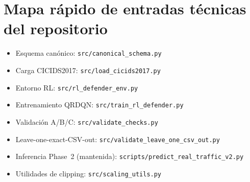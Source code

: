 \documentclass[12pt,a4paper]{article}
\begin{document}
\section{Mapa rápido de entradas técnicas del repositorio}

\begin{itemize}
  \item Esquema canónico: \verb|src/canonical_schema.py|
  \item Carga CICIDS2017: \verb|src/load_cicids2017.py|
  \item Entorno RL: \verb|src/rl_defender_env.py|
  \item Entrenamiento QRDQN: \verb|src/train_rl_defender.py|
  \item Validación A/B/C: \verb|src/validate_checks.py|
  \item Leave-one-exact-CSV-out: \verb|src/validate_leave_one_csv_out.py|
  \item Inferencia Phase~2 (mantenida): \verb|scripts/predict_real_traffic_v2.py|
  \item Utilidades de clipping: \verb|src/scaling_utils.py|
\end{itemize}
\end{document}
